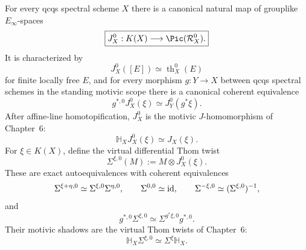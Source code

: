 \begin{theorem}
\label{thm:bn-diff-differential-j}
For every qcqs spectral scheme \(X\) there is a canonical natural map of
grouplike \(E_\infty\)-spaces
\[
  \boxed{
  J_X^0:
  K(X)
  \longrightarrow
  \Pic(\mathcal R_X^0).
  }
\]
It is characterized by
\[
  \boxed{
  J_X^0([E])
  \simeq
  \operatorname{th}^0_X(E)
  }
\]
for finite locally free \(E\), and for every morphism \(g:Y\to X\) between
qcqs spectral schemes in the standing motivic scope there is a canonical
coherent equivalence
\[
  \boxed{
  g^{*,0}J_X^0(\xi)
  \simeq
  J_Y^0(g^*\xi).
  }
\]
After affine-line homotopification, \(J_X^0\) is the motivic
\(J\)-homomorphism of Chapter~6:
\[
  \boxed{
  \mathbb H_XJ_X^0(\xi)
  \simeq
  J_X(\xi).
  }
\]
For \(\xi\in K(X)\), define the virtual differential Thom twist
\[
  \Sigma^{\xi,0}(M)
  :=
  M\otimes J_X^0(\xi).
\]
These are exact autoequivalences with coherent equivalences
\[
  \Sigma^{\xi+\eta,0}
  \simeq
  \Sigma^{\xi,0}\Sigma^{\eta,0},
  \qquad
  \Sigma^{0,0}\simeq\operatorname{id},
  \qquad
  \Sigma^{-\xi,0}\simeq(\Sigma^{\xi,0})^{-1},
\]
and
\[
  \boxed{
  g^{*,0}\Sigma^{\xi,0}
  \simeq
  \Sigma^{g^*\xi,0}g^{*,0}.
  }
\]
Their motivic shadows are the virtual Thom twists of Chapter~6:
\[
  \boxed{
  \mathbb H_X\Sigma^{\xi,0}
  \simeq
  \Sigma^\xi\mathbb H_X.
  }
\]
\end{theorem}

